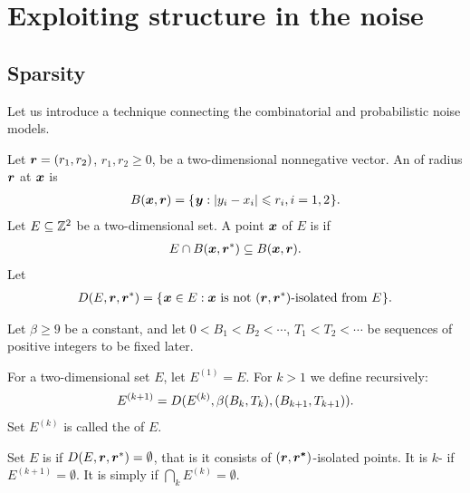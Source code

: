 \documentclass[12pt]{memoir}
\def\B{B}
\newcommand{\Tu}{T}
\begin{document}
\section{Exploiting structure in the noise}\label{sec:noise}

\subsection{Sparsity}
Let us introduce a technique connecting the combinatorial and probabilistic
noise models.

\begin{definition}
Let \( \boldsymbol{r}=(r_1,r_2) \), \( r_1, r_2\ge 0 \),
be a two-dimensional nonnegative vector.
An  of radius \( \boldsymbol{r} \)  at \( \boldsymbol{x} \) is
\begin{align}\label{eq:ball1}
  B(\boldsymbol{x},\boldsymbol{r}) = \mathopen\{\mskip 1mu\boldsymbol{y} : |y_i - x_i| \leqslant r_i, i=1,2\mskip 1mu\mathclose\}.
\end{align}  
Let \( E\subseteq \mathbb{Z}^{2} \) be a two-dimensional set.
A point \( \boldsymbol{x} \) of \( E \) is  if
\begin{align*}
  E \cap B(\boldsymbol{x},\boldsymbol{r}^*)\subseteq B(\boldsymbol{x}, \boldsymbol{r}).
 \end{align*}
  Let
\begin{align}
  D(E,\boldsymbol{r}, \boldsymbol{r}^*) =
     \mathopen\{\mskip 1mu\boldsymbol{x}\in E : \boldsymbol{x} \text{\rmfamily\mdseries\upshape{ is not }} (\boldsymbol{r}, \boldsymbol{r}^*)\text{\rmfamily\mdseries\upshape{-isolated
  from }} E\mskip 1mu\mathclose\}.
\end{align}
\end{definition}

\begin{definition}[Sparsity]
Let \( \beta\ge 9 \) be a constant, and let 
\( 0<\B_{1}<\B_{2}<\dotsm \), \( \Tu_{1}<\Tu_{2}<\dotsm \) be 
sequences of positive integers to be fixed later.

For a two-dimensional set \( E \), let \( E^{(1)} = E \).
For \( k>1 \) we define recursively:
\begin{align}\label{eq:noise^k}
    E^{(k+1)} = D(E^{(k)}, \beta\pair{\B_k}{\Tu_{k}}, \pair{\B_{k+1}}{\Tu_{k+1}}).
\end{align}
Set \( E^{(k)} \) is called the  of \( E \).

Set \( E \) is  
if \( D(E, \boldsymbol{r}, \boldsymbol{r}^*)=\emptyset \), that is 
it consists of \( (\boldsymbol{r}, \boldsymbol{r^*}) \)-isolated points.
It is \( k \)- if \( E^{(k+1)}=\emptyset \).
It is simply  if \( \bigcap_{k}E^{(k)}=\emptyset \).
\end{definition}
\end{document}
